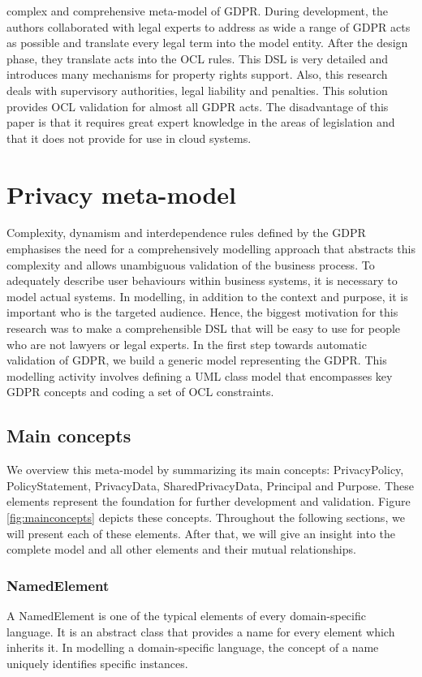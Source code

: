 \documentclass[11pt,english]{article}
\begin{document}
complex and comprehensive meta-model of GDPR. During development, the authors collaborated with legal experts to address as wide a range of GDPR acts as possible and translate every legal term into the model entity. After the design phase, they translate acts into the OCL rules. This DSL is very detailed and introduces many mechanisms for property rights support. Also, this research deals with supervisory authorities, legal liability and penalties. This solution provides OCL validation for almost all GDPR acts. The disadvantage of this paper is that it requires great expert knowledge in the areas of legislation and that it does not provide for use in cloud systems.
\section{Privacy meta-model}
Complexity, dynamism and interdependence rules defined by the GDPR emphasises the need for a comprehensively modelling approach that abstracts this complexity and allows unambiguous validation of the business process. To adequately describe user behaviours within business systems, it is necessary to model actual systems. In modelling, in addition to the context and purpose, it is important who is the targeted audience. Hence, the biggest motivation for this research was to make a comprehensible DSL that will be easy to use for people who are not lawyers or legal experts. In the first step towards automatic validation of GDPR, we build a generic model representing the GDPR. This modelling activity involves defining a UML class model that encompasses key GDPR concepts and coding a set of OCL constraints.
\subsection{Main concepts}
We overview this meta-model by summarizing its main concepts: PrivacyPolicy, PolicyStatement, PrivacyData, SharedPrivacyData, Principal and Purpose. These elements represent the foundation for further development and validation. Figure \ref{fig:mainconcepts} depicts these concepts. Throughout the following sections, we will present each of these elements. After that, we will give an insight into the complete model and all other elements and their mutual relationships.
\subsubsection{NamedElement}
A NamedElement is one of the typical elements of every domain-specific language. It is an abstract class that provides a name for every element which inherits it. In modelling a domain-specific language, the concept of a name uniquely identifies specific instances.
\end{document}
